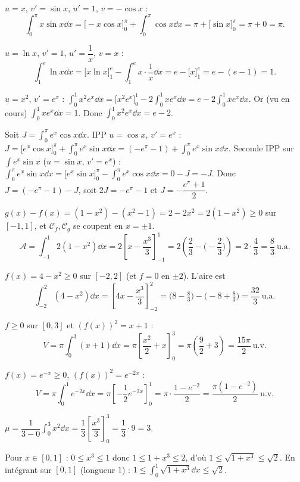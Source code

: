 $u=x$, $v'=\sin x$, $u'=1$, $v=-\cos x$ :
\[
\int_0^{\pi}x\sin x\dd x=\big[-x\cos x\big]_0^{\pi}+\int_0^{\pi}\cos x\dd x=\pi+\big[\sin x\big]_0^{\pi}=\pi+0=\pi.
\]

$u=\ln x$, $v'=1$, $u'=\dfrac1x$, $v=x$ :
\[
\int_1^e\ln x\dd x=\big[x\ln x\big]_1^e-\int_1^e x\cdot\frac1x\dd x=e-\big[x\big]_1^e=e-(e-1)=1.
\]

$u=x^2$, $v'=e^x$ : $\displaystyle\int_0^1 x^2 e^x\dd x=\big[x^2 e^x\big]_0^1-2\int_0^1 x e^x\dd x=e-2\int_0^1 xe^x\dd x$.
Or (vu en cours) $\displaystyle\int_0^1 x e^x\dd x=1$. Donc $\displaystyle\int_0^1 x^2 e^x\dd x=e-2$.

Soit $J=\displaystyle\int_0^{\pi} e^x\cos x\dd x$. IPP $u=\cos x$, $v'=e^x$ :
$J=\big[e^x\cos x\big]_0^{\pi}+\int_0^{\pi}e^x\sin x\dd x=(-e^\pi-1)+\int_0^\pi e^x\sin x\dd x$.
Seconde IPP sur $\int e^x\sin x$ ($u=\sin x$, $v'=e^x$) :
$\int_0^\pi e^x\sin x\dd x=\big[e^x\sin x\big]_0^\pi-\int_0^\pi e^x\cos x\dd x=0-J=-J$.
Donc $J=(-e^\pi-1)-J$, soit $2J=-e^\pi-1$ et $\boxed{J=-\dfrac{e^\pi+1}{2}}$.

$g(x)-f(x)=(1-x^2)-(x^2-1)=2-2x^2=2(1-x^2)\ge0$ sur $[-1,1]$, et $\mathcal C_f,\mathcal C_g$ se coupent en $x=\pm1$.
\[
\mathcal A=\int_{-1}^1 2(1-x^2)\dd x=2\left[x-\frac{x^3}{3}\right]_{-1}^1=2\left(\frac23-\Big(-\frac23\Big)\right)=2\cdot\frac43=\frac83\ \text{u.a.}
\]

$f(x)=4-x^2\ge0$ sur $[-2,2]$ (et $f=0$ en $\pm2$). L'aire est
\[
\int_{-2}^2(4-x^2)\dd x=\left[4x-\frac{x^3}{3}\right]_{-2}^2=\Big(8-\tfrac83\Big)-\Big(-8+\tfrac83\Big)=\frac{32}{3}\ \text{u.a.}
\]

$f\ge0$ sur $[0,3]$ et $(f(x))^2=x+1$ :
\[
V=\pi\int_0^3(x+1)\dd x=\pi\left[\frac{x^2}{2}+x\right]_0^3=\pi\left(\frac92+3\right)=\frac{15\pi}{2}\ \text{u.v.}
\]

$f(x)=e^{-x}\ge0$, $(f(x))^2=e^{-2x}$ :
\[
V=\pi\int_0^1 e^{-2x}\dd x=\pi\left[-\frac12 e^{-2x}\right]_0^1=\pi\cdot\frac{1-e^{-2}}{2}=\frac{\pi(1-e^{-2})}{2}\ \text{u.v.}
\]

$\mu=\dfrac{1}{3-0}\displaystyle\int_0^3 x^2\dd x=\dfrac13\left[\dfrac{x^3}{3}\right]_0^3=\dfrac13\cdot 9=3$.

Pour $x\in[0,1]$ : $0\le x^3\le1$ donc $1\le 1+x^3\le2$, d'où $1\le\sqrt{1+x^3}\le\sqrt2$. En intégrant
sur $[0,1]$ (longueur $1$) : $\displaystyle 1\le\int_0^1\sqrt{1+x^3}\dd x\le\sqrt2$.

